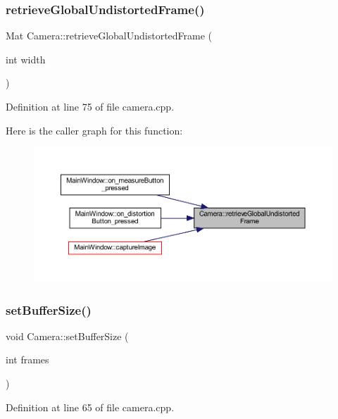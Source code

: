 \subsubsection{\texorpdfstring{retrieveGlobalUndistortedFrame()}{retrieveGlobalUndistortedFrame()}}
{\footnotesize\ttfamily Mat Camera\+::retrieve\+Global\+Undistorted\+Frame (\begin{DoxyParamCaption}\item[{int}]{width }\end{DoxyParamCaption})}



Definition at line 75 of file camera.\+cpp.

Here is the caller graph for this function\+:
\nopagebreak
\begin{figure}[H]
\begin{center}
\leavevmode
\includegraphics[width=350pt]{class_camera_a9b9c3210f57f3646f19e31904d5a0544_icgraph}
\end{center}
\end{figure}
\mbox{\label{class_camera_a74895f8b2414f9d5cc84682b096e0d66}} 
\subsubsection{\texorpdfstring{setBufferSize()}{setBufferSize()}}
{\footnotesize\ttfamily void Camera\+::set\+Buffer\+Size (\begin{DoxyParamCaption}\item[{int}]{frames }\end{DoxyParamCaption})}



Definition at line 65 of file camera.\+cpp.

\mbox{\label{class_camera_a9c9ba5d6bed27bdd033ea40280741cf9}} 
